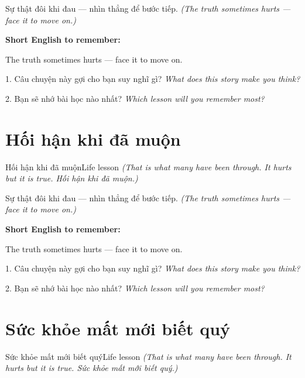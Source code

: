 \begin{baihoc}
Sự thật đôi khi đau — nhìn thẳng để bước tiếp.
\textit{(The truth sometimes hurts — face it to move on.)}
\end{baihoc}

\begin{ghinhoanh}
\textbf{Short English to remember:}

The truth sometimes hurts — face it to move on.

\end{ghinhoanh}

\begin{tuhocnhanh}
1. Câu chuyện này gợi cho bạn suy nghĩ gì? \textit{What does this story make you think?}

2. Bạn sẽ nhớ bài học nào nhất? \textit{Which lesson will you remember most?}
\end{tuhocnhanh}
\ngancach


\section{Hối hận khi đã muộn}
\begin{truyen}{Hối hận khi đã muộn}{Life lesson}
\textit{(That is what many have been through. It hurts but it is true. Hối hận khi đã muộn.)}
\end{truyen}

\begin{baihoc}
Sự thật đôi khi đau — nhìn thẳng để bước tiếp.
\textit{(The truth sometimes hurts — face it to move on.)}
\end{baihoc}

\begin{ghinhoanh}
\textbf{Short English to remember:}

The truth sometimes hurts — face it to move on.

\end{ghinhoanh}

\begin{tuhocnhanh}
1. Câu chuyện này gợi cho bạn suy nghĩ gì? \textit{What does this story make you think?}

2. Bạn sẽ nhớ bài học nào nhất? \textit{Which lesson will you remember most?}
\end{tuhocnhanh}
\ngancach


\section{Sức khỏe mất mới biết quý}
\begin{truyen}{Sức khỏe mất mới biết quý}{Life lesson}
\textit{(That is what many have been through. It hurts but it is true. Sức khỏe mất mới biết quý.)}
\end{truyen}

